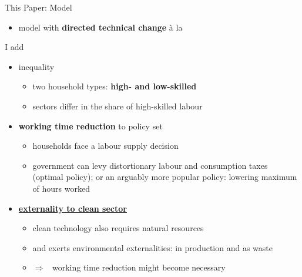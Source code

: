 \documentclass[11pt,aspectratio=169]{beamer}
\newcommand{\tr}[1]{\textcolor{blue}{#1}}
\newcommand{\ar}{$\Rightarrow$ \ }
\begin{document}
\begin{frame}{This Paper: Model}
	\begin{itemize}
\item model with \textbf{\alert{directed technical change}}  à la \cite{Acemoglu2012TheChange}
\end{itemize}
\pause
I add 
\begin{itemize}
\item<+-> inequality
\begin{itemize}
\item two household types: \textbf{\alert{high- and low-skilled}}
\item sectors differ in the share of high-skilled labour 
\end{itemize}
\item<+-> \alert{\textbf{working time reduction}} to policy set
\begin{itemize}
\item households face a labour supply decision
\item government can levy distortionary labour and consumption taxes (optimal policy); or an arguably more popular policy: lowering maximum of hours worked
\end{itemize}

\item<+-> %
 \hyperlink{cleanSec}{\textbf{\alert{externality to clean sector}} }
\begin{itemize}
	\item clean technology also requires natural resources
	\item and exerts environmental externalities: in production and as waste
	\item[] \ar working time reduction might become necessary %
\end{itemize}
	\end{itemize}
\end{frame}
\end{document}
